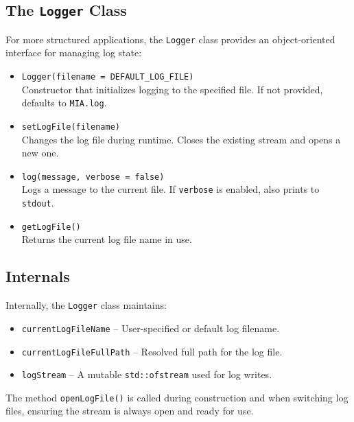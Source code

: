 \subsection{The \texttt{Logger} Class}
For more structured applications, the \texttt{Logger} class provides an object-oriented interface for managing log state:

\begin{itemize}\itemsep0em
	\item \texttt{Logger(filename = DEFAULT\_LOG\_FILE)}\\
	Constructor that initializes logging to the specified file. If not provided, defaults to \texttt{MIA.log}.
	
	\item \texttt{setLogFile(filename)}\\
	Changes the log file during runtime. Closes the existing stream and opens a new one.
	
	\item \texttt{log(message, verbose = false)}\\
	Logs a message to the current file. If \texttt{verbose} is enabled, also prints to \texttt{stdout}.
	
	\item \texttt{getLogFile()}\\
	Returns the current log file name in use.
\end{itemize}

\subsection{Internals}
Internally, the \texttt{Logger} class maintains:

\begin{itemize}\itemsep0em
	\item \texttt{currentLogFileName} -- User-specified or default log filename.
	\item \texttt{currentLogFileFullPath} -- Resolved full path for the log file.
	\item \texttt{logStream} -- A mutable \texttt{std::ofstream} used for log writes.
\end{itemize}

The method \texttt{openLogFile()} is called during construction and when switching log files, ensuring the stream is always open and ready for use.

